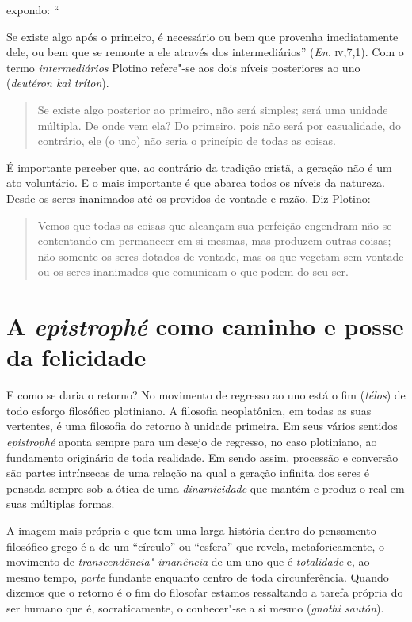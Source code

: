 expondo: ``{Se existe algo após o primeiro, é necessário ou bem
que provenha imediatamente dele, ou bem que se remonte a ele através
dos intermediários'' (\emph{En}. \textsc{iv},7,1). Com o termo
\emph{intermediários} Plotino refere"-se aos dois níveis posteriores
ao uno (\emph{deutéron kaì tríton}).

\begin{quote}
Se existe algo posterior ao primeiro, não será simples; será uma unidade
múltipla. De onde vem ela? Do primeiro, pois não será por casualidade,
do contrário, ele (o uno) não seria o princípio de todas as coisas.
\end{quote}

É importante perceber que, ao contrário da tradição cristã, a
geração não é um ato voluntário. E o mais importante é que abarca todos
os níveis da natureza. Desde os seres inanimados até os providos de
vontade e razão. Diz Plotino:
\begin{quote} 
Vemos que todas as coisas que alcançam sua perfeição engendram não se
contentando em permanecer em si mesmas, mas produzem outras coisas; não
somente os seres dotados de vontade, mas os que vegetam sem vontade ou
os seres inanimados que comunicam o que podem do seu ser.
\end{quote} 

\section{A \emph{epistrophé} como caminho e posse da
felicidade}

E como se daria o retorno? No movimento de regresso ao uno está o
fim (\emph{télos}) de todo esforço filosófico plotiniano. A filosofia
neoplatônica, em todas as suas vertentes, é uma filosofia do retorno à
unidade primeira. Em seus vários sentidos \emph{epistrophé} aponta
sempre para um desejo de regresso, no caso plotiniano, ao fundamento
originário de toda realidade. Em sendo assim, processão e conversão são
partes intrínsecas de uma relação na qual a geração infinita dos seres
é pensada sempre sob a ótica de uma \emph{dinamicidade} que mantém e
produz o real em suas múltiplas formas.

A imagem mais própria e que tem uma larga história dentro do
pensamento filosófico grego é a de um “círculo” ou “esfera” que revela,
metaforicamente, o movimento de \emph{transcendência"-imanência} de um
uno que é \emph{totalidade} e, ao mesmo tempo, \emph{parte}
fundante enquanto centro de toda circunferência. Quando dizemos que o
retorno é o fim do filosofar estamos ressaltando a tarefa própria do
ser humano que é, socraticamente, o conhecer"-se a si mesmo
(\emph{gnothi sautón}). 

}
